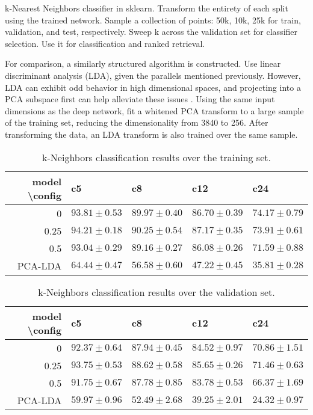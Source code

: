 k-Nearest Neighbors classifier in sklearn.
Transform the entirety of each split using the trained network.
Sample a collection of points: 50k, 10k, 25k for train, validation, and test, respectively.
Sweep k across the validation set for classifier selection.
Use it for classification and ranked retrieval.

For comparison, a similarly structured algorithm is constructed.
Use linear discriminant analysis (LDA), given the parallels mentioned previously.
However, LDA can exhibit odd behavior in high dimensional spaces, and projecting into a PCA subspace first can help alleviate these issues \cite{PCASubspace?}.
Using the same input dimensions as the deep network, fit a whitened PCA transform to a large sample of the training set, reducing the dimensionality from 3840 to 256.
After transforming the data, an LDA transform is also trained over the same sample.

\begin{table*}[h]
\begin{center}
\caption{k-Neighbors classification results over the training set.}
\small
\begin{tabular}{rllll}
 model \textbackslash config  & c5    & c8   & c12  & c24  \\
\hline
 0    & $93.81\pm0.53$ & $89.97\pm0.40$ & $86.70\pm0.39$ & $74.17\pm0.79$ \\
 0.25 & $94.21\pm0.18$ & $90.25\pm0.54$ & $87.17\pm0.35$ & $73.91\pm0.61$ \\
 0.5  & $93.04\pm0.29$ & $89.16\pm0.27$ & $86.08\pm0.26$ & $71.59\pm0.88$ \\
 \hline
 PCA-LDA & $64.44\pm0.47$ & $56.58\pm0.60$ & $47.22\pm0.45$ & $35.81\pm0.28$ \\

\hline
\end{tabular}
\label{tab:things}
\end{center}
\end{table*}

\begin{table*}[h]
\begin{center}
\caption{k-Neighbors classification results over the validation set.}
\small
\begin{tabular}{rllll}
\hline
model \textbackslash config & c5  & c8 & c12   & c24     \\
\hline
 0    & $92.37\pm0.64$ & $87.94\pm0.45$ & $84.52\pm0.97$ & $70.86\pm1.51$ \\
 0.25 & $93.75\pm0.53$ & $88.62\pm0.58$ & $85.65\pm0.26$ & $71.46\pm0.63$ \\
 0.5  & $91.75\pm0.67$ & $87.78\pm0.85$ & $83.78\pm0.53$ & $66.37\pm1.69$ \\
 \hline
 PCA-LDA & $59.97\pm0.96$ & $52.49\pm2.68$ & $39.25\pm2.01$ & $24.32\pm0.97$ \\
\hline
\end{tabular}
\label{tab:things}
\end{center}
\end{table*}


